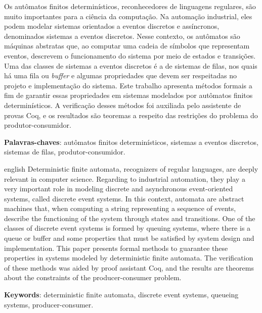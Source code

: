 \begin{resumo}
 Os autômatos finitos determinísticos, reconhecedores de linguagens regulares, são muito importantes para a ciência da computação. Na automação industrial, eles podem modelar sistemas orientados a eventos discretos e assíncronos, denominados sistemas a eventos discretos. Nesse contexto, os autômatos são máquinas abstratas que, ao computar uma cadeia de símbolos que representam eventos, descrevem o funcionamento do sistema por meio de estados e transições. Uma das classes de sistemas a eventos discretos é a de sistemas de filas, nos quais há uma fila ou \textit{buffer} e algumas propriedades que devem ser respeitadas no projeto e implementação do sistema. Este trabalho apresenta métodos formais a fim de garantir essas propriedades em sistemas modelados por autômatos finitos determinísticos. A verificação desses métodos foi auxiliada pelo assistente de provas Coq, e os resultados são teoremas a respeito das restrições do problema do produtor-consumidor.

 \vspace{\onelineskip}
    
 \noindent
 \textbf{Palavras-chaves}: autômatos finitos determinísticos, sistemas a eventos discretos, sistemas de filas, produtor-consumidor.
\end{resumo}


\begin{resumo}[Abstract]
 \begin{otherlanguage*}{english}
 Deterministic finite automata, recognizers of regular languages, are deeply relevant in computer science. Regarding to industrial automation, they play a very important role in modeling discrete and asynchronous event-oriented systems, called discrete event systems. In this context, automata are abstract machines that, when computing a string representing a sequence of events, describe the functioning of the system through states and transitions. One of the classes of discrete event systems is formed by queuing systems, where there is a queue or buffer and some properties that must be satisfied by system design and implementation. This paper presents formal methods to guarantee these properties in systems modeled by deterministic finite automata. The verification of these methods was aided by proof assistant Coq, and the results are theorems about the constraints of the producer-consumer problem.
 
 \vspace{\onelineskip}
 
 \noindent 
 \textbf{Keywords}: deterministic finite automata, discrete event systems, queueing systems, producer-consumer.
 \end{otherlanguage*}
\end{resumo}


\listoffigures*
\cleardoublepage




\listofquadros*
\cleardoublepage
